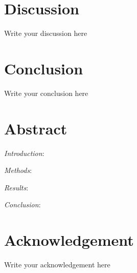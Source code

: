\documentclass[
	    a4paper, 				%
	    bibliography=totocnumbered,		%
	    listof=totocnumbered,		%
	    11pt, 				%
]{scrreprt}
\begin{document}
	\chapter{Discussion}
		Write your discussion here
				
	\chapter{Conclusion}
		Write your conclusion here
		
	\chapter{Abstract}
		\textit{Introduction}: 
		\par 
		\textit{Methods}: 
		\par
		\textit{Results}: 
		\par
		\textit{Conclusion}: 


	\appendix
	\printbibliography
	\listoftables
	\listoffigures
	\printnomenclature
	\chapter{Acknowledgement}  
	Write your acknowledgement here
	
	
\end{document}

